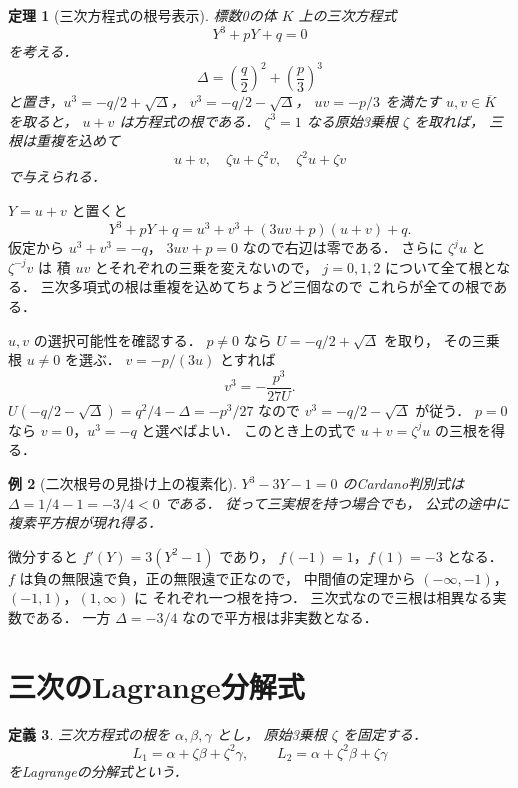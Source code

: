\documentclass[a5paper,10pt,onecolumn]{jsarticle}
\makeatletter
\theoremstyle{mathnotetheorem}
\newtheorem{theorem}{定理}[section]
\newtheorem{definition}[theorem]{定義}
\newtheorem{example}[theorem]{例}
\renewcommand{\proofname}{証明}
\renewenvironment{proof}[1][\proofname]{%
  \par\pushQED{\qed}\normalfont\topsep4\p@\@plus2\p@\relax
  \trivlist\item[\hskip\labelsep\bfseries #1]\ignorespaces
}{\popQED\endtrivlist\@endpefalse}
\makeatother
\begin{document}
\begin{theorem}[三次方程式の根号表示]\label{thm:cardano}
標数0の体 $K$ 上の三次方程式
\[
 Y^3+pY+q=0
\]
を考える．
\[
 \Delta=\left(\frac q2\right)^2+
          \left(\frac p3\right)^3
\]
と置き，$u^3=-q/2+\sqrt\Delta$，
$v^3=-q/2-\sqrt\Delta$，
$uv=-p/3$ を満たす $u,v\in\overline K$ を取ると，
$u+v$ は方程式の根である．
$\zeta^3=1$ なる原始3乗根 $\zeta$ を取れば，
三根は重複を込めて
\[
 u+v,\quad\zeta u+\zeta^2v,\quad
 \zeta^2u+\zeta v
\]
で与えられる．
\end{theorem}
\begin{proof}
$Y=u+v$ と置くと
\[
 Y^3+pY+q
 =u^3+v^3+(3uv+p)(u+v)+q.
\]
仮定から $u^3+v^3=-q$，
$3uv+p=0$ なので右辺は零である．
さらに
$\zeta^j u$ と $\zeta^{-j}v$ は
積 $uv$ とそれぞれの三乗を変えないので，
$j=0,1,2$ について全て根となる．
三次多項式の根は重複を込めてちょうど三個なので
これらが全ての根である．

$u,v$ の選択可能性を確認する．
$p\ne0$ なら
$U=-q/2+\sqrt\Delta$ を取り，
その三乗根 $u\ne0$ を選ぶ．
$v=-p/(3u)$ とすれば
\[
 v^3=-\frac{p^3}{27U}.
\]
$U(-q/2-\sqrt\Delta)
 =q^2/4-\Delta=-p^3/27$
なので $v^3=-q/2-\sqrt\Delta$ が従う．
$p=0$ なら $v=0$，$u^3=-q$ と選べばよい．
このとき上の式で $u+v=\zeta^ju$ の三根を得る．
\end{proof}

\begin{example}[二次根号の見掛け上の複素化]
$Y^3-3Y-1=0$ のCardano判別式は
$\Delta=1/4-1=-3/4<0$ である．
従って三実根を持つ場合でも，
公式の途中に複素平方根が現れ得る．
\end{example}
\begin{proof}
微分すると
$f'(Y)=3(Y^2-1)$ であり，
$f(-1)=1$，$f(1)=-3$ となる．
$f$ は負の無限遠で負，正の無限遠で正なので，
中間値の定理から
$(-\infty,-1)$，$(-1,1)$，$(1,\infty)$ に
それぞれ一つ根を持つ．
三次式なので三根は相異なる実数である．
一方 $\Delta=-3/4$ なので平方根は非実数となる．
\end{proof}

\section{三次のLagrange分解式}

\begin{definition}
三次方程式の根を $\alpha,\beta,\gamma$ とし，
原始3乗根 $\zeta$ を固定する．
\[
 L_1=\alpha+\zeta\beta+\zeta^2\gamma,\qquad
 L_2=\alpha+\zeta^2\beta+\zeta\gamma
\]
をLagrangeの分解式という．
\end{definition}
\end{document}
